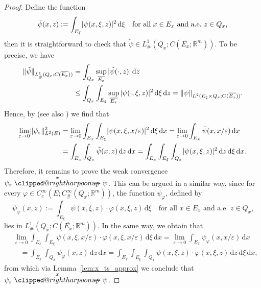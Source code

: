 \documentclass[reqno,11pt]{amsart}
\makeatletter
\numberwithin{equation}{section}
\theoremstyle{thmlemcorr}
\numberwithin{theorem}{section}
\theoremstyle{thmlemcorr*}
\theoremstyle{defi}
\theoremstyle{remexample}
\theoremstyle{ass}
\newcommand{\R}{\mathbb{R}}
\renewcommand{\epsilon}{\varepsilon}
\newcommand{\dd}{\,\mathrm{d}}
\DeclarePairedDelimiter{\abs}{\lvert}{\rvert}
\DeclarePairedDelimiter{\norm}{\lVert}{\rVert}
\newcommand{\1}{\mathds{1}}
\DeclareRobustCommand{\wtwoscale}{%
  \clippedrightharpoonup\mathrel{\mspace{-15mu}}\rightharpoonup
}
\newcommand{\clippedrightharpoonup}{%
  \mathrel{\mathpalette\clipped@rightharpoonup\relax}%
}
\newcommand{\clipped@rightharpoonup}[2]{%
  \sbox\z@{$\m@th#1\mspace{6mu}$}%
  \clipbox{0pt 0pt {\dimexpr\width-.5\wd\z@} 0pt}{$\m@th#1\rightharpoonup$}%
  \smash{\clipbox{{\wd\z@} 0pt 0pt {-\width}}{$\m@th#1\rightharpoonup$}}%
}
\newcommand{\wxtwoscale}{\overset{x}{\wtwoscale}}
\newcommand{\dl}{\,\mathrm{d}}
\makeatother
\begin{document}
\begin{proof}
    Define the function
    \[
    \tilde{\psi}(x,z):=\int_{E_\xi}\abs{\psi(x,\xi,z)}^2\dd \xi \quad \text{for all $x \in E_x$ and a.e.~$z \in Q_x$,}
    \]
    then it is straightforward to check that $\tilde{\psi} \in L^1_{\#}(Q_x;C(\overline{E_x};\R^m))$. To be precise, we have
    \begin{align*}
        \norm{\tilde{\psi}}_{L^1_{\#}(Q_x;C(\overline{E_x}))}
        &= \int _{Q_x}\sup_{\overline{E_x}}|\tilde{\psi}(\cdot,z)|\dl z\\
        &\le \int _{Q_x}\int_{E_\xi}\sup_{\overline{E_x}}|\psi(\cdot,\xi,z)|^2 \dl \xi\dl z
        = \norm{\psi}_{L^2(E_\xi\times Q_x;C(\overline{E_x}))}.
    \end{align*}
    Hence, by \cite[Corollary~5.4]{All92} (see also \cite[Theorem~2, Theorem~3]{LNW02}) we find that
    \begin{align*}
        \lim_{\epsilon \to 0}\norm{\psi_\epsilon}_{L^2(E)}^2 &= \lim_{\epsilon \to 0} \int_{E_x}\int_{E_\xi} \abs{\psi(x,\xi,x/\epsilon)}^2\dd \xi \dd x = \lim_{\epsilon \to 0}\int_{E_x} \tilde{\psi}(x,x/\epsilon)\dd x \\
        &= \int_{E_x}\int_{Q_x}\tilde{\psi}(x,z)\dd z\dd x = \int_{E_x}\int_{E_\xi}\int_{Q_x}\abs{\psi(x,\xi,z)}^2\dd z\dd \xi\dd x.
    \end{align*}
    Therefore, it remains to prove the weak convergence $\psi_\epsilon \wxtwoscale \psi$. This can be argued in a similar way, since for every $\varphi \in C_c^{\infty}(E;C_{\#}^{\infty}(Q_x;\R^m))$, the function $\psi_{\varphi}$, defined by
    \[
    \psi_{\varphi}(x,z):=\int_{E_\xi}\psi(x,\xi,z) \cdot \varphi(x,\xi,z)\dd \xi \quad \text{for all $x \in E_x$ and a.e.~$z \in Q_x$,}
    \]
    lies in $ L^1_{\#}(Q_x;C(\overline{E_x};\R^m))$. In the same way, we obtain that
    \begin{align*}
        &\lim_{\epsilon \to 0} \int_{E_x}\int_{E_\xi} \psi(x,\xi,x/\epsilon)\cdot \varphi(x,\xi,x/\epsilon)\dd \xi \dd x = \lim_{\epsilon \to 0}\int_{E_x} \psi_{\varphi}(x,x/\epsilon)\dd x \\
        &\quad= \int_{E_x}\int_{Q_x}\psi_{\varphi}(x,z)\dd z\dd x = \int_{E_x}\int_{E_\xi}\int_{Q_x}\psi(x,\xi,z)\cdot \varphi(x,\xi,z)\dd z\dd \xi\dd x,
    \end{align*}
    from which via Lemma~\ref{lem:x_ts_approx} we conclude that $\psi_\epsilon \wxtwoscale \psi$.
\end{proof}
\end{document}
